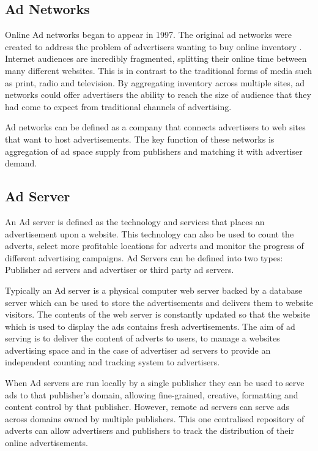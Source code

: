 \documentclass[12pt]{article}
\begin{document}
\subsection{Ad Networks} \label{AdNetwork}
Online Ad networks began to appear in 1997. The original ad networks were created to address the problem of advertisers wanting to buy online inventory \parencite{adExchanges}. Internet audiences are incredibly fragmented, splitting their online time between many different websites. This is in contrast to the traditional forms of media such as print, radio and television. By aggregating inventory across multiple sites, ad networks could offer advertisers the ability to reach the size of audience that they had come to expect from traditional channels of advertising. \newline

Ad networks can be defined as a company that connects advertisers to web sites that want to host advertisements. The key function of these networks is aggregation of ad space supply from publishers and matching it with advertiser demand. 

\subsection{Ad Server}
An Ad server is defined as the technology and services that places an advertisement upon a website. This technology can also be used to count the adverts, select more profitable locations for adverts and monitor the progress of different advertising campaigns. Ad Servers can be defined into two types: Publisher ad servers and advertiser or third party ad servers. \newline 

Typically an Ad server is a physical computer web server backed by a database server which can be used to store the advertisements and delivers them to website visitors. The contents of the web server is constantly updated so that the website which is used to display the ads contains fresh advertisements. The aim of ad serving is to deliver the content of adverts to users, to manage a websites advertising space and in the case of advertiser ad servers to provide an independent counting and tracking system to advertisers. \newline 

When Ad servers are run locally by a single publisher they can be used to serve ads to that publisher's domain, allowing fine-grained, creative, formatting and content control by that publisher. However, remote ad servers can serve ads across domains owned by multiple publishers. This one centralised repository of adverts can allow advertisers and publishers to track the distribution of their online advertisements. 
\newline
\end{document}
